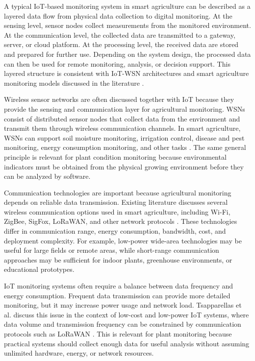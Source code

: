 A typical IoT-based monitoring system in smart agriculture can be described as a layered data flow from physical data collection to digital monitoring. At the sensing level, sensor nodes collect measurements from the monitored environment. At the communication level, the collected data are transmitted to a gateway, server, or cloud platform. At the processing level, the received data are stored and prepared for further use. Depending on the system design, the processed data can then be used for remote monitoring, analysis, or decision support. This layered structure is consistent with IoT-WSN architectures and smart agriculture monitoring models discussed in the literature \cite{mowla2023iot,qazi2022iot}.

Wireless sensor networks are often discussed together with IoT because they provide the sensing and communication layer for agricultural monitoring. WSNs consist of distributed sensor nodes that collect data from the environment and transmit them through wireless communication channels. In smart agriculture, WSNs can support soil moisture monitoring, irrigation control, disease and pest monitoring, energy consumption monitoring, and other tasks \cite{mowla2023iot}. The same general principle is relevant for plant condition monitoring because environmental indicators must be obtained from the physical growing environment before they can be analyzed by software.

Communication technologies are important because agricultural monitoring depends on reliable data transmission. Existing literature discusses several wireless communication options used in smart agriculture, including Wi-Fi, ZigBee, SigFox, LoRaWAN, and other network protocols \cite{mowla2023iot}. These technologies differ in communication range, energy consumption, bandwidth, cost, and deployment complexity. For example, low-power wide-area technologies may be useful for large fields or remote areas, while short-range communication approaches may be sufficient for indoor plants, greenhouse environments, or educational prototypes.

IoT monitoring systems often require a balance between data frequency and energy consumption. Frequent data transmission can provide more detailed monitoring, but it may increase power usage and network load. Tsapparellas et al. discuss this issue in the context of low-cost and low-power IoT systems, where data volume and transmission frequency can be constrained by communication protocols such as LoRaWAN \cite{tsapparellas2020laplacian}. This is relevant for plant monitoring because practical systems should collect enough data for useful analysis without assuming unlimited hardware, energy, or network resources.

